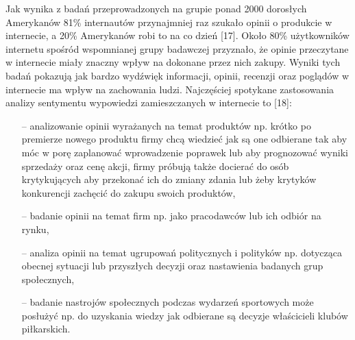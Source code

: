 Jak wynika z badań przeprowadzonych na grupie ponad 2000 dorosłych Amerykanów 81\% internautów przynajmniej raz szukało opinii o produkcie w internecie, a 20\% Amerykanów robi to na co dzień [17]. Około 80\% użytkowników internetu spośród wspomnianej grupy badawczej przyznało, że opinie przeczytane w internecie miały znaczny wpływ na dokonane przez nich zakupy. Wyniki tych badań pokazują jak bardzo wydźwięk informacji, opinii, recenzji oraz poglądów w internecie ma wpływ na zachowania ludzi. Najczęściej spotykane zastosowania analizy sentymentu wypowiedzi zamieszczanych w internecie to [18]:
\begin{itemize}
	\item[--] analizowanie opinii wyrażanych na temat produktów np. krótko po premierze nowego produktu firmy chcą wiedzieć jak są one odbierane tak aby móc w porę zaplanować wprowadzenie poprawek lub aby prognozować wyniki sprzedaży oraz cenę akcji, firmy próbują także docierać do osób krytykujących aby przekonać ich do zmiany zdania lub żeby krytyków konkurencji zachęcić do zakupu swoich produktów,
	\item[--] badanie opinii na temat firm np. jako pracodawców lub ich odbiór na rynku,
	\item[--] analiza opinii na temat ugrupowań politycznych i polityków np. dotycząca obecnej sytuacji lub przyszłych decyzji oraz nastawienia badanych grup społecznych,
	\item[--] badanie nastrojów społecznych podczas wydarzeń sportowych może posłużyć np. do uzyskania wiedzy jak odbierane są decyzje właścicieli klubów piłkarskich. 
\end{itemize}

   



